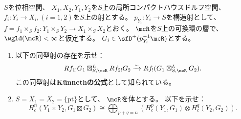 \documentclass[uplatex,dvipdfmx]{jsarticle}
\begin{document}
\maketitle
\HeaderCommentA
\section{}
\LocCptRemark
\fi


\begin{prob}\label{2.18}
  \(S\)を位相空間、
  \(X_1,X_2,Y_1,Y_2\)を\(S\)上の局所コンパクトハウスドルフ空間、
  \(f_i:Y_i\to X_i,(i=1,2)\)を\(S\)上の射とする。
  \(p_{Y_i}:Y_i\to S\)を構造射として、
  \(f=f_1\times_Sf_2:Y_1\times_S Y_2 \to X_1\times_S X_2\)とおく。
  \(\mcR\)を\(S\)上の可換環の層で、
  \(\wgld(\mcR) < \infty\)と仮定する。
  \(G_i\in \sfD^+(p_{Y_i}^{-1}\mcR)\)とする。
  \begin{enumerate}
    \item \label{2.18.1}
    以下の同型射の存在を示せ：
    \[
    Rf_{1!}G_1 \boxtimes_{S,\mcR}^L Rf_{2!}G_2
    \xrightarrow{\sim} Rf_!(G_1 \boxtimes_{S,\mcR}^L G_2).
    \]
    この同型射は\textbf{K\"{u}nnethの公式}として知られている。
    \item \label{2.18.2}
    \(S=X_1=X_2=\{\mathrm{pt}\}\)として、
    \(\mcR\)を体とする。
    以下を示せ：
    \[
    H^n_c(Y_1\times Y_2,G_1\boxtimes G_2) \cong
    \bigoplus_{p+q=n}(H^p_c(Y_1,G_1)\otimes H^q_c(Y_2,G_2)).
    \]
  \end{enumerate}
\end{prob}
\end{document}

